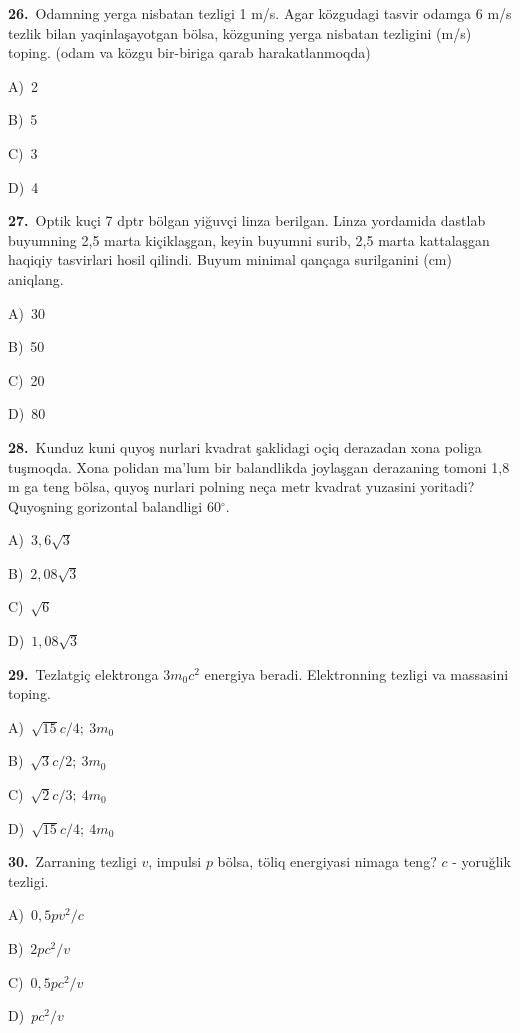 \documentclass[11pt,a4paper]{article}
\newcommand{\opt}[2]{\hspace*{4mm}#1)\ #2\par}
\begin{document}
\noindent\begin{minipage}{\linewidth}
\textbf{26.}\ Odamning yerga nisbatan tezligi 1 m/s. Agar közgudagi tasvir odamga 6 m/s tezlik bilan yaqinlaşayotgan bölsa, közguning yerga nisbatan tezligini (m/s) toping. (odam va közgu bir-biriga qarab harakatlanmoqda)\par\smallskip
\opt{A}{2}
\opt{B}{5}
\opt{C}{3}
\opt{D}{4}
\end{minipage}\vspace{9pt}\par
\noindent\begin{minipage}{\linewidth}
\textbf{27.}\ Optik kuçi 7 dptr bölgan yiğuvçi linza berilgan. Linza yordamida dastlab buyumning 2,5 marta kiçiklaşgan, keyin buyumni surib, 2,5 marta kattalaşgan haqiqiy tasvirlari hosil qilindi. Buyum minimal qançaga surilganini (cm) aniqlang.\par\smallskip
\opt{A}{30}
\opt{B}{50}
\opt{C}{20}
\opt{D}{80}
\end{minipage}\vspace{9pt}\par
\noindent\begin{minipage}{\linewidth}
\textbf{28.}\ Kunduz kuni quyoş nurlari kvadrat şaklidagi oçiq derazadan xona poliga tuşmoqda. Xona polidan ma’lum bir balandlikda joylaşgan derazaning tomoni 1,8 m ga teng bölsa, quyoş nurlari polning neça metr kvadrat yuzasini yoritadi? Quyoşning gorizontal balandligi 60$^\circ$.\par\smallskip
\opt{A}{$3{,}6\sqrt3$}
\opt{B}{$2{,}08\sqrt3$}
\opt{C}{$\sqrt6$}
\opt{D}{$1{,}08\sqrt3$}
\end{minipage}\vspace{9pt}\par
\noindent\begin{minipage}{\linewidth}
\textbf{29.}\ Tezlatgiç elektronga $3m_0c^2$ energiya beradi. Elektronning tezligi va massasini toping.\par\smallskip
\opt{A}{$\sqrt{15}c/4;\ 3m_0$}
\opt{B}{$\sqrt3c/2;\ 3m_0$}
\opt{C}{$\sqrt2c/3;\ 4m_0$}
\opt{D}{$\sqrt{15}c/4;\ 4m_0$}
\end{minipage}\vspace{9pt}\par
\noindent\begin{minipage}{\linewidth}
\textbf{30.}\ Zarraning tezligi $v$, impulsi $p$ bölsa, töliq energiyasi nimaga teng? $c$ - yoruğlik tezligi.\par\smallskip
\opt{A}{$0{,}5pv^2/c$}
\opt{B}{$2pc^2/v$}
\opt{C}{$0{,}5pc^2/v$}
\opt{D}{$pc^2/v$}
\end{minipage}\vspace{9pt}\par
\end{document}
